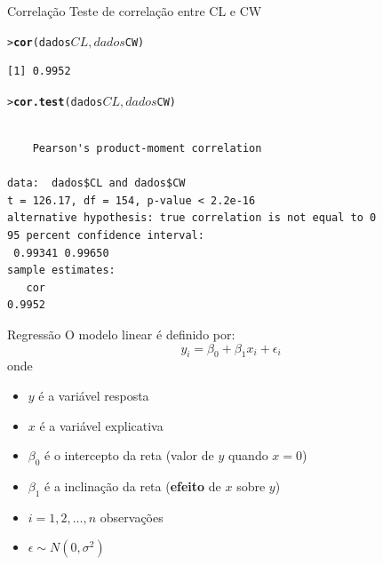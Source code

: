 \documentclass[10pt]{beamer}\usepackage{graphicx, color}
\makeatletter
\newcommand{\hlfunctioncall}[1]{\textcolor[rgb]{0,0,0.545098039215686}{\textbf{#1}}}%
\newenvironment{kframe}{%
 \def\at@end@of@kframe{}%
 \ifinner\ifhmode%
  \def\at@end@of@kframe{\end{minipage}}%
  \begin{minipage}{\columnwidth}%
 \fi\fi%
 \def\FrameCommand##1{\hskip\@totalleftmargin \hskip-\fboxsep
 \colorbox{shadecolor}{##1}\hskip-\fboxsep
     \hskip-\linewidth \hskip-\@totalleftmargin \hskip\columnwidth}%
 \MakeFramed {\advance\hsize-\width
   \@totalleftmargin\z@ \linewidth\hsize
   \@setminipage}}%
 {\par\unskip\endMakeFramed%
 \at@end@of@kframe}
\newenvironment{knitrout}{}{} %
\makeatother
\begin{document}
\begin{frame}[fragile=singleslide]{Correlação}
Teste de correlação entre CL e CW
\begin{knitrout}\small
{}\color{fgcolor}\begin{kframe}
\begin{alltt}
> \hlfunctioncall{cor}(dados$CL, dados$CW)
\end{alltt}
\begin{verbatim}
[1] 0.9952
\end{verbatim}
\begin{alltt}
> \hlfunctioncall{cor.test}(dados$CL, dados$CW)
\end{alltt}
\begin{verbatim}

	Pearson's product-moment correlation

data:  dados$CL and dados$CW 
t = 126.17, df = 154, p-value < 2.2e-16
alternative hypothesis: true correlation is not equal to 0 
95 percent confidence interval:
 0.99341 0.99650 
sample estimates:
   cor 
0.9952 

\end{verbatim}
\end{kframe}
\end{knitrout}

\end{frame}

\begin{frame}[fragile=singleslide]{Regressão}
O modelo linear é definido por:
\begin{equation*}
  y_i = \beta_0 + \beta_1 x_{i} + \epsilon_i
\end{equation*}
onde
\begin{itemize}
\item $y$ é a variável resposta
\item $x$ é a variável explicativa
\item $\beta_0$ é o intercepto da reta (valor de $y$ quando $x = 0$)
\item $\beta_1$ é a inclinação da reta (\textbf{efeito} de $x$ sobre $y$)
\item $i = 1, 2, \ldots, n$ observações
\item $\epsilon \sim N(0, \sigma^2)$
\end{itemize}
\end{frame}
\end{document}

